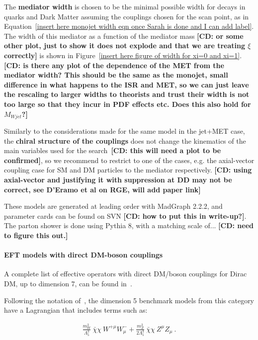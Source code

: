 The \textbf{mediator width} is chosen to be the minimal possible width
for decays in quarks and Dark Matter assuming the couplings chosen
for the scan point, as in Equation~\ref{insert here monojet width eqn once Sarah is done and I can add label}. 
The width of this mediator as a function of the mediator mass 
\textbf{[CD: or some other plot, just to show it does not explode 
and that we are treating $\xi$ correctly]} is shown in Figure~\ref{insert here
figure of width for xi=0 and xi=1}. \textbf{[CD: is there any plot
of the dependence of the MET from the mediator width? This should be the same as the 
monojet, small difference in what happens to the ISR and MET, so we can just leave
the rescaling to larger widths to theorists and trust their width is not too large
so that they incur in PDF effects etc. Does this also hold for $M_{Wjet}$?]}

Similarly to the considerations made for the same model in the jet+MET case, 
the \textbf{chiral structure of the couplings}
does not change the kinematics of the main variables used for the 
search~\textbf{[CD: this will need a plot to be confirmed]}, 
so we recommend to restrict to one of the cases, e.g. the axial-vector coupling case for
SM and DM particles to the mediator respectively. 
\textbf{[CD: using axial-vector and justifying it with suppression at DD may not be
correct, see D'Eramo et al on RGE, will add paper link]}

These models are generated at leading order with MadGraph 2.2.2, and parameter
cards can be found on SVN \textbf{[CD: how to put this in write-up?]}.
The parton shower is done using Pythia 8, with a matching scale of... 
\textbf{[CD: need to figure this out.]}

\paragraph{EFT models with direct DM-boson couplings}

A complete list of effective operators with direct DM/boson couplings for
Dirac DM, up to dimension 7, can be found in~\citep{Cotta:2012nj}. 

Following the notation of~\citep{1212.3352}, the dimension 5 benchmark models 
from this category have a Lagrangian that includes terms such as:

\begin{eqnarray}
\frac{m_W^2}{\Lambda_5^3} ~\bar{\chi} \chi ~W^{+ \mu} W^{-}_\mu
+ \frac{m_Z^2}{2 \Lambda_5^3} ~ \bar{\chi} \chi ~ Z^\mu Z_\mu ~.
\end{eqnarray}
 
